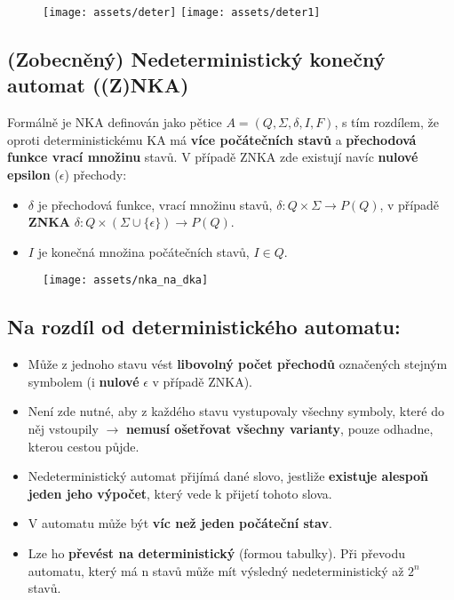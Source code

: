 \begin{figure}[H]
    \centering
    \texttt{[image: assets/deter]}
    \texttt{[image: assets/deter1]}
\end{figure}

\subsection{(Zobecněný) Nedeterministický konečný automat ((Z)NKA)}
Formálně je NKA definován jako pětice $A = (Q, \Sigma, \delta, I, F)$, s tím rozdílem, že oproti deterministickému KA má \textbf{více počátečních stavů} a \textbf{přechodová funkce vrací množinu} stavů. V případě ZNKA zde existují navíc \textbf{nulové epsilon} ($\epsilon$) přechody:
\begin{itemize}
    \item $\delta$ je přechodová funkce, vrací množinu stavů, $\delta: Q \times \Sigma \rightarrow P(Q)$, v případě \textbf{ZNKA} $\delta: Q \times (\Sigma \cup \{\epsilon\}) \rightarrow P(Q)$.
    \item $I$ je konečná množina počátečních stavů, $I \in Q$.
\end{itemize}

\begin{figure}[H]
    \centering
    \texttt{[image: assets/nka\_na\_dka]}
\end{figure}

\subsection*{Na rozdíl od deterministického automatu:}
\begin{itemize}
    \item Může z jednoho stavu vést \textbf{libovolný počet přechodů} označených stejným symbolem (i \textbf{nulové} $\epsilon$ v případě ZNKA).
    \item Není zde nutné, aby z každého stavu vystupovaly všechny symboly, které do něj vstoupily $\rightarrow$ \textbf{nemusí ošetřovat všechny varianty}, pouze odhadne, kterou cestou půjde.
    \item Nedeterministický automat přijímá dané slovo, jestliže \textbf{existuje alespoň jeden jeho výpočet}, který vede k přijetí tohoto slova.
    \item V automatu může být \textbf{víc než jeden počáteční stav}.
    \item Lze ho \textbf{převést na deterministický} (formou tabulky). Při převodu automatu, který má n stavů může mít výsledný nedeterministický až $2^n$ stavů.
\end{itemize}


